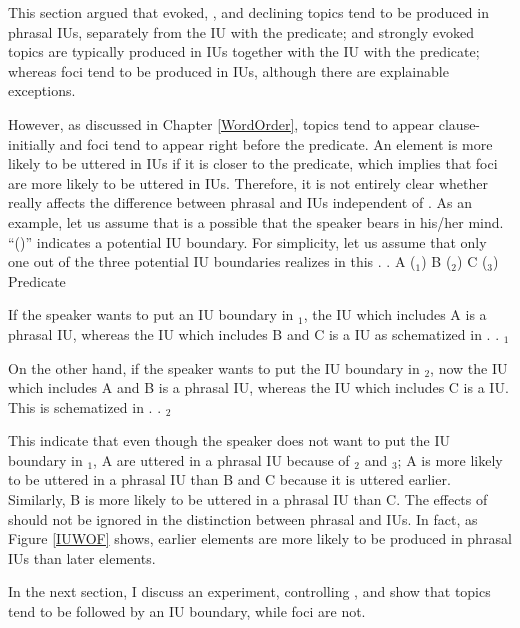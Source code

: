 This section argued that
evoked, , and declining topics tend to be produced in phrasal IUs,
separately from the IU with the predicate; and
strongly evoked topics are typically produced in  IUs
together with the IU with the predicate;
whereas foci tend to be produced in  IUs,
although there are explainable exceptions.

However, as discussed in Chapter \ref{WordOrder},
topics tend to appear clause-initially and foci tend to appear right before the predicate.
An element is more likely to be uttered in  IUs
if it is closer to the predicate,
which implies that
foci are more likely to be uttered in  IUs.
Therefore, it is not entirely clear whether  really
affects the difference between phrasal and  IUs independent of .
As an example, let us assume that \Next is a possible  that the speaker bears in his/her mind.
``(\tp{\dvline})'' indicates a potential IU boundary.
For simplicity,
let us assume that
only one out of the three potential IU boundaries realizes in this .
%
\ex. A (\tp{\dvline}$_1$) B (\tp{\dvline}$_2$) C (\tp{\dvline}$_3$) Predicate

If the speaker wants to put an IU boundary in \tp{\dvline}$_1$,
the IU which includes A is a phrasal IU,
whereas the IU which includes B and C is a  IU
as schematized in \Next.
%
\ex.  \tp{\dvline}$_1$ 

On the other hand, if the speaker wants to put the IU boundary in \tp{\dvline}$_2$,
now the IU which includes A and B is a phrasal IU,
whereas the IU which includes C is a  IU.
This is schematized in \Next.
%
\ex.  \tp{\dvline}$_2$ 

This indicate that even though the speaker does not want to put the IU boundary in \tp{\dvline}$_1$,
A are uttered in a phrasal IU because of \tp{\dvline}$_2$ and \tp{\dvline}$_3$;
A is more likely to be uttered in a phrasal IU than B and C because it is uttered earlier.
Similarly, B is more likely to be uttered in a phrasal IU than C.
The effects of  should not be ignored in the distinction between phrasal and  IUs.
In fact,
as Figure \ref{IUWOF} shows,
earlier elements are more likely to be produced in phrasal IUs
than later elements.

In the next section,
I discuss an experiment, controlling ,
and show that topics tend to be followed by an IU boundary,
while foci are not.




